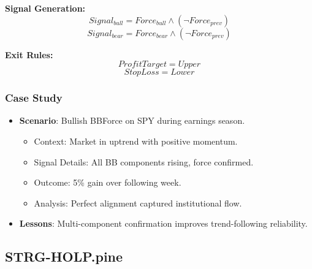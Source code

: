 \documentclass[12pt]{article}
\begin{document}
\textbf{Signal Generation:}
\[
Signal_{bull} = Force_{bull} \land (\neg Force_{prev})
\]
\[
Signal_{bear} = Force_{bear} \land (\neg Force_{prev})
\]

\textbf{Exit Rules:}
\[
ProfitTarget = Upper
\]
\[
StopLoss = Lower
\]

\subsubsection{Case Study}
\begin{itemize}
\item \textbf{Scenario}: Bullish BBForce on SPY during earnings season.
  \begin{itemize}
  \item Context: Market in uptrend with positive momentum.
  \item Signal Details: All BB components rising, force confirmed.
  \item Outcome: 5\% gain over following week.
  \item Analysis: Perfect alignment captured institutional flow.
  \end{itemize}
\item \textbf{Lessons}: Multi-component confirmation improves trend-following reliability.
\end{itemize}

\subsection{STRG-HOLP.pine}
\label{subsec:strg_holp}
\end{document}
